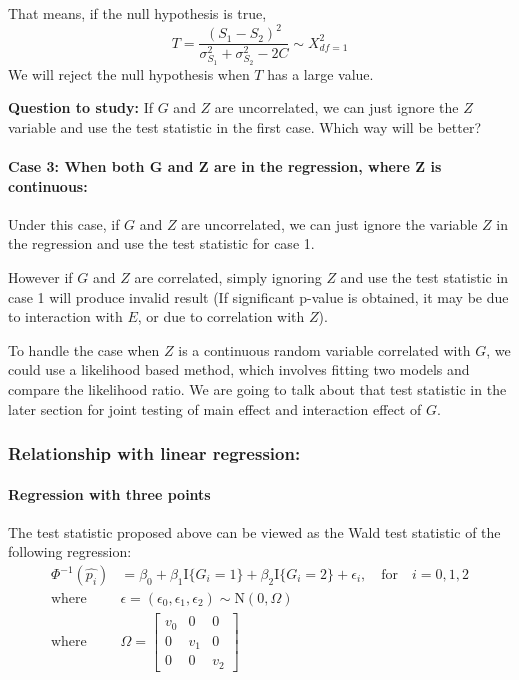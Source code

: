 \documentclass[
]{article}
\begin{document}
That means, if the null hypothesis is true,
\[ T = \frac{(S_1-S_2)^2}{\sigma_{S_1}^2+\sigma_{S_2}^2 -2C} \sim X^2_{df=1}\]
We will reject the null hypothesis when \(T\) has a large value.

\textbf{Question to study:} If \(G\) and \(Z\) are uncorrelated, we can
just ignore the \(Z\) variable and use the test statistic in the first
case. Which way will be better?

\hypertarget{case-3-when-both-g-and-z-are-in-the-regression-where-z-is-continuous}{%
\paragraph{Case 3: When both G and Z are in the regression, where Z is
continuous:}\label{case-3-when-both-g-and-z-are-in-the-regression-where-z-is-continuous}}

Under this case, if \(G\) and \(Z\) are uncorrelated, we can just ignore
the variable \(Z\) in the regression and use the test statistic for case
1.

However if \(G\) and \(Z\) are correlated, simply ignoring \(Z\) and use
the test statistic in case 1 will produce invalid result (If significant
p-value is obtained, it may be due to interaction with \(E\), or due to
correlation with \(Z\)).

To handle the case when \(Z\) is a continuous random variable correlated
with \(G\), we could use a likelihood based method, which involves
fitting two models and compare the likelihood ratio. We are going to
talk about that test statistic in the later section for joint testing of
main effect and interaction effect of \(G\).

\hypertarget{relationship-with-linear-regression}{%
\subsubsection{Relationship with linear
regression:}\label{relationship-with-linear-regression}}

\hypertarget{regression-with-three-points}{%
\paragraph{Regression with three
points}\label{regression-with-three-points}}

The test statistic proposed above can be viewed as the Wald test
statistic of the following regression:
\begin{equation}\label{eqn:asWaldTest}
\begin{aligned}
\Phi^{-1}(\hat{p_{i}}) &= \beta_0 + \beta_1 \text{I}\{G_i = 1\} + \beta_2 \text{I}\{G_i = 2\} + \epsilon_i,\quad \text{for} \quad i = 0,1,2 \\
\text{where} \quad &\epsilon = (\epsilon_0, \epsilon_1, \epsilon_2) \sim \text{N}(0,\Omega) \\
\text{where} \quad &\Omega = \begin{bmatrix} v_0 & 0 & 0 \\ 0 & v_1 & 0 \\ 0 & 0 & v_2 \end{bmatrix}
\end{aligned}
\end{equation}
\end{document}
